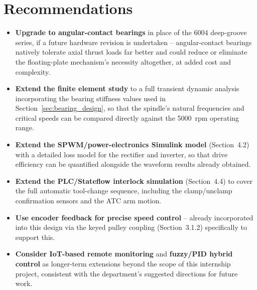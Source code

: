 \documentclass[12pt,a4paper]{report}
\begin{document}
	\section{Recommendations}
	\begin{itemize}
		\item \textbf{Upgrade to angular-contact bearings} in place of the 6004 deep-groove
		series, if a future hardware revision is undertaken -- angular-contact bearings
		natively tolerate axial thrust loads far better and could reduce or eliminate the
		floating-plate mechanism's necessity altogether, at added cost and complexity.
		\item \textbf{Extend the finite element study} to a full transient dynamic analysis
		incorporating the bearing stiffness values used in Section~\ref{sec:bearing_design}, so that the spindle's
		natural frequencies and critical speeds can be compared directly against the 5000~rpm
		operating range.
		\item \textbf{Extend the SPWM/power-electronics Simulink model} (Section~4.2) with a
		detailed loss model for the rectifier and inverter, so that drive efficiency can be
		quantified alongside the waveform results already obtained.
		\item \textbf{Extend the PLC/Stateflow interlock simulation} (Section~4.4) to cover the
		full automatic tool-change sequence, including the clamp/unclamp confirmation sensors
		and the ATC arm motion.
		\item \textbf{Use encoder feedback for precise speed control} -- already incorporated into
		this design via the keyed pulley coupling (Section~3.1.2) specifically to support this.
		\item \textbf{Consider IoT-based remote monitoring} and \textbf{fuzzy/PID hybrid control}
		as longer-term extensions beyond the scope of this internship project, consistent with the
		department's suggested directions for future work.
	\end{itemize}
		
\end{document}
